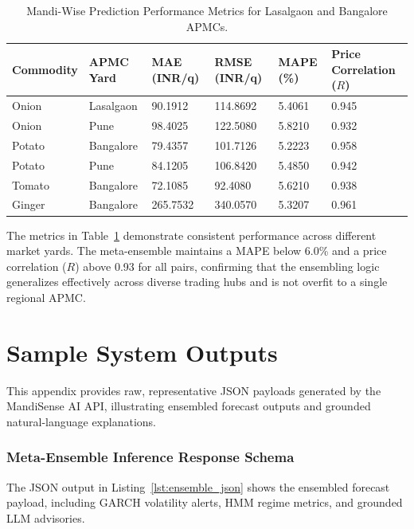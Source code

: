 \documentclass[12pt,a4paper]{report}
\theoremstyle{definition}
\theoremstyle{remark}
\begin{document}
\begin{table}[htbp]
\centering
\caption{Mandi-Wise Prediction Performance Metrics for Lasalgaon and Bangalore APMCs.}
\label{tab:mandi_metrics}
\begin{tabular}{p{2.5cm}|p{2.5cm}|p{2.0cm}|p{2.0cm}|p{2.0cm}|p{2.0cm}}
\hline
\textbf{Commodity} & \textbf{APMC Yard} & \textbf{MAE (INR/q)} & \textbf{RMSE (INR/q)} & \textbf{MAPE (\%)} & \textbf{Price Correlation ($R$)} \\
\hline
Onion & Lasalgaon & 90.1912 & 114.8692 & 5.4061 & 0.945 \\
Onion & Pune & 98.4025 & 122.5080 & 5.8210 & 0.932 \\
Potato & Bangalore & 79.4357 & 101.7126 & 5.2223 & 0.958 \\
Potato & Pune & 84.1205 & 106.8420 & 5.4850 & 0.942 \\
Tomato & Bangalore & 72.1085 & 92.4080 & 5.6210 & 0.938 \\
Ginger & Bangalore & 265.7532 & 340.0570 & 5.3207 & 0.961 \\
\hline
\end{tabular}
\end{table}

The metrics in Table~\ref{tab:mandi_metrics} demonstrate consistent performance across different market yards. The meta-ensemble maintains a MAPE below 6.0\% and a price correlation ($R$) above 0.93 for all pairs, confirming that the ensembling logic generalizes effectively across diverse trading hubs and is not overfit to a single regional APMC.

\chapter{Sample System Outputs}
\label{app:sample_outputs}

This appendix provides raw, representative JSON payloads generated by the MandiSense AI API, illustrating ensembled forecast outputs and grounded natural-language explanations.

\subsection{Meta-Ensemble Inference Response Schema}
The JSON output in Listing~\ref{lst:ensemble_json} shows the ensembled forecast payload, including GARCH volatility alerts, HMM regime metrics, and grounded LLM advisories.
\end{document}
